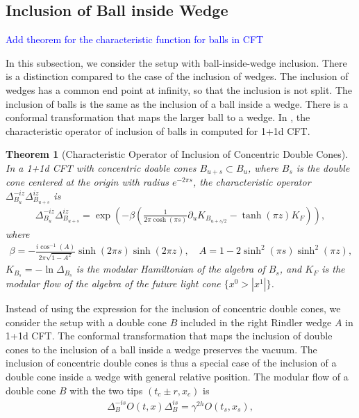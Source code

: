 \documentclass[a4paper,11pt]{article}
\newtheorem{theorem}{Theorem}
\theoremstyle{definition}
\theoremstyle{remark}
\newcommand{\NL}[1]{\textcolor{blue}{#1}}
\begin{document}
\subsection{Inclusion of Ball inside Wedge}

\NL{Add theorem for the characteristic function for balls in CFT}

In this subsection, we consider the setup with ball-inside-wedge inclusion. There is a distinction compared to the case of the inclusion of wedges. The inclusion of wedges has a common end point at infinity, so that the inclusion is not split. The inclusion of balls is the same as the inclusion of a ball inside a wedge. There is a conformal transformation that maps the larger ball to a wedge. In \cite{}, the characteristic operator of inclusion of balls in computed for 1+1d CFT.
\begin{theorem}[Characteristic Operator of Inclusion of Concentric Double Cones]
    In a 1+1d CFT with concentric doable cones $B_{u+s} \subset B_u$, where $B_s$ is the double cone centered at the origin with radius $e^{-2\pi s}$, the characteristic operator $\Delta_{B_u}^{-iz}\Delta_{B_{u+s}}^{iz}$ is 
    \begin{align}
        \Delta_{B_u}^{-iz}\Delta_{B_{u+s}}^{iz} = \exp\left( -\beta\left(\frac{1}{2\pi \cosh(\pi s)}\partial_uK_{B_{u+s/2}}-\tanh(\pi z)K_F\right) \right),
    \end{align}
    where 
    \begin{gather}
        \beta = -\frac{i \cos^{-1}(A)}{2\pi \sqrt{1-A^2}}\sinh(2\pi s)\sinh(2\pi z), \quad
        A = 1-2\sinh^2(\pi s)\sinh^2(\pi z),
    \end{gather}
    $K_{B_s} = -\ln\Delta_{B_s}$ is the modular Hamiltonian of the algebra of $B_s$, and $K_F$ is the modular flow of the algebra of the future light cone $\{x^0>|x^1|\}$.
\end{theorem}
Instead of using the expression for the inclusion of concentric double cones, we consider the setup with a double cone $B$ included in the right Rindler wedge $A$ in 1+1d CFT. The conformal transformation that maps the inclusion of double cones to the inclusion of a ball inside a wedge preserves the vacuum. The inclusion of concentric double cones is thus a special case of the inclusion of a double cone inside a wedge with general relative position. The modular flow of a double cone $B$ with the two tips $(t_c\pm r,x_c)$ is
\begin{align}
    \Delta_B^{-is} O(t,x) \Delta_B^{is} = \gamma^{2h} O(t_s,x_s),
\end{align}
\end{document}
